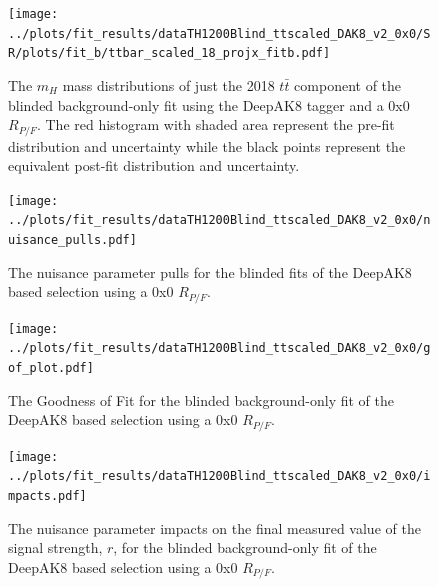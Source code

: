\documentclass[10pt,oneside]{article}
\begin{document}
\begin{figure}[H]
    \centering
    \texttt{[image: ../plots/fit\_results/dataTH1200Blind\_ttscaled\_DAK8\_v2\_0x0/SR/plots/fit\_b/ttbar\_scaled\_18\_projx\_fitb.pdf]}
    \caption{The $m_H$ mass distributions of just the 2018 $t\bar{t}$ component of the blinded background-only fit using the DeepAK8 tagger and a 0x0 $R_{P/F}$.
    The red histogram with shaded area represent the pre-fit distribution and uncertainty while the black points represent the equivalent
    post-fit distribution and uncertainty.}
    \label{figs:DAK8_mth_tt18}
\end{figure}
\begin{figure}[H]
    \centering
    \texttt{[image: ../plots/fit\_results/dataTH1200Blind\_ttscaled\_DAK8\_v2\_0x0/nuisance\_pulls.pdf]}
    \caption{The nuisance parameter pulls for the blinded fits of the DeepAK8 based selection using a 0x0 $R_{P/F}$.}
    \label{figs:DAK8_nuis}
\end{figure}
\begin{figure}[H]
    \centering
    \texttt{[image: ../plots/fit\_results/dataTH1200Blind\_ttscaled\_DAK8\_v2\_0x0/gof\_plot.pdf]}
    \caption{The Goodness of Fit for the blinded background-only fit of the DeepAK8 based selection using a 0x0 $R_{P/F}$.}
    \label{figs:DAK8_gof}
\end{figure}
\begin{figure}[H]
    \centering
    \texttt{[image: ../plots/fit\_results/dataTH1200Blind\_ttscaled\_DAK8\_v2\_0x0/impacts.pdf]}
    \caption{The nuisance parameter impacts on the final measured value of the signal strength, $r$, for the blinded
    background-only fit of the DeepAK8 based selection using a 0x0 $R_{P/F}$.}
    \label{figs:DAK8_impacts}
\end{figure}
\end{document}
